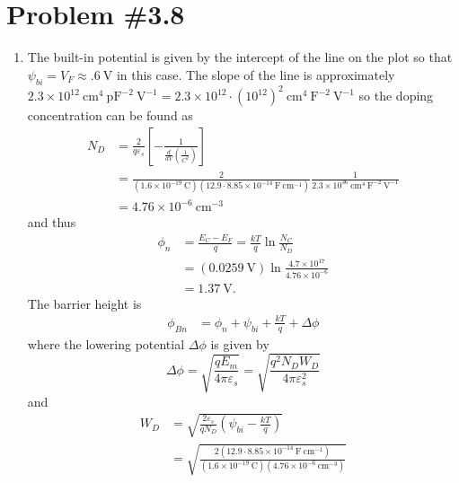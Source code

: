 \documentclass{article}
\begin{document}
\section*{Problem \#3.8}
\begin{enumerate}
  \item{The built-in potential is given by the intercept of the line on the 
        plot so that $\psi_{bi} = V_{F} \approx .6 ~\mathrm{V}$ in this case.
        The slope of the line is approximately 
        $2.3 \times 10^{12} ~\mathrm{cm}^{4} ~\mathrm{pF}^{-2} ~\mathrm{V}^{-1}
        = 2.3 \times 10^{12}\cdot (10^{12})^2 ~\mathrm{cm}^4 ~\mathrm{F}^{-2} ~\mathrm{V}^{-1}$ so the doping
        concentration can be found as
        \begin{align*}
        N_D &= \frac{2}{q \varepsilon_s}\left[
               -\frac{1}{\frac{d}{dV}\left(\frac{1}{C^2}\right)}\right] \\
            &= \frac{2}{(1.6 \times 10^{-19} ~\mathrm{C})
                        (12.9 \cdot 8.85 \times 10^{-14} ~\mathrm{F}~\mathrm{cm}^{-1})}
               \frac{1}{2.3 \times 10^{36} ~\mathrm{cm}^4 ~\mathrm{F}^{-2}~\mathrm{V}^{-1}} \\
            &= 4.76 \times 10^{-6} ~\mathrm{cm}^{-3} 
       \end{align*}
       and thus
       \begin{align*}
         \phi_{n} &= \frac{E_{C} - E_{F}}{q} = \frac{kT}{q} \ln \frac{N_C}{N_D} \\
                  &= (0.0259 ~\mathrm{V}) \ln \frac{4.7 \times 10^{17}}{4.76 \times 10^{-6}} \\
                  &= 1.37 ~\mathrm{V}.
       \end{align*}
       The barrier height is
       \begin{align*}
         \phi_{Bn} &= \phi_n + \psi_{bi} + \frac{kT}{q} + \Delta \phi 
       \end{align*}
       where the lowering potential $\Delta \phi$ is given by
       $$
       \Delta \phi = \sqrt{\frac{q E_m}{4 \pi \varepsilon_s}} 
                   = \sqrt{\frac{q^2 N_D W_D}{4 \pi \varepsilon_s^2}}
       $$
       and
       \begin{align*}
       W_{D} &= \sqrt{\frac{2 \varepsilon_s}{q N_D}\left(\psi_{bi} - \frac{kT}{q}\right)} \\
             &= \sqrt{\frac{2 (12.9 \cdot 8.85 \times 10^{-14} ~\mathrm{F}~\mathrm{cm}^{-1})}
                           {(1.6 \times 10^{-19} ~\mathrm{C})
                            (4.76 \times 10^{-6} ~\mathrm{cm}^{-3})}
}
\end{align*}}
\end{enumerate}
\end{document}
